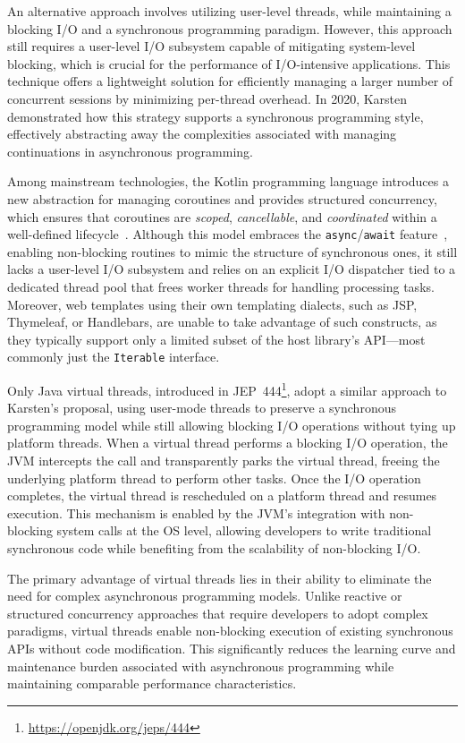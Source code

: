 An alternative approach involves utilizing user-level threads, while
maintaining a blocking I/O and a synchronous programming paradigm. However,
this approach still requires a user-level I/O subsystem capable of mitigating
system-level blocking, which is crucial for the performance of I/O-intensive
applications. This technique offers a lightweight solution for efficiently
managing a larger number of concurrent sessions by minimizing per-thread
overhead. In 2020, Karsten~\cite{karsten2020} demonstrated how this strategy
supports a synchronous programming style, effectively abstracting away the
complexities associated with managing continuations in asynchronous
programming.

Among mainstream technologies, the Kotlin programming language introduces a new
abstraction for managing coroutines and provides structured concurrency, which
ensures that coroutines are \textit{scoped}, \textit{cancellable}, and
\textit{coordinated} within a well-defined
lifecycle~\cite{elizarov2021coroutines}. Although this model embraces the
\texttt{async}/\texttt{await} feature~\cite{async_await}, enabling non-blocking
routines to mimic the structure of synchronous ones, it still lacks a
user-level I/O subsystem and relies on an explicit I/O dispatcher tied to a
dedicated thread pool that frees worker threads for handling processing tasks.
Moreover, web templates using their own templating dialects, such as JSP,
Thymeleaf, or Handlebars, are unable to take advantage of such constructs, as
they typically support only a limited subset of the host library's API—most
commonly just the \texttt{Iterable} interface.

Only Java virtual threads, introduced in
JEP~444\footnote{\url{https://openjdk.org/jeps/444}}, adopt a similar approach
to Karsten's proposal, using user-mode threads to preserve a synchronous
programming model while still allowing blocking I/O operations without tying up
platform threads. When a virtual thread performs a blocking I/O operation, the
JVM intercepts the call and transparently parks the virtual thread, freeing the
underlying platform thread to perform other tasks. Once the I/O operation
completes, the virtual thread is rescheduled on a platform thread and resumes
execution. This mechanism is enabled by the JVM's integration with non-blocking
system calls at the OS level, allowing developers to write traditional
synchronous code while benefiting from the scalability of non-blocking I/O.

The primary advantage of virtual threads lies in their ability to eliminate the
need for complex asynchronous programming models. Unlike reactive or structured
concurrency approaches that require developers to adopt complex paradigms, virtual
threads enable non-blocking execution of existing synchronous APIs without code
modification. This significantly reduces the learning curve and maintenance
burden associated with asynchronous programming while maintaining comparable
performance characteristics.

